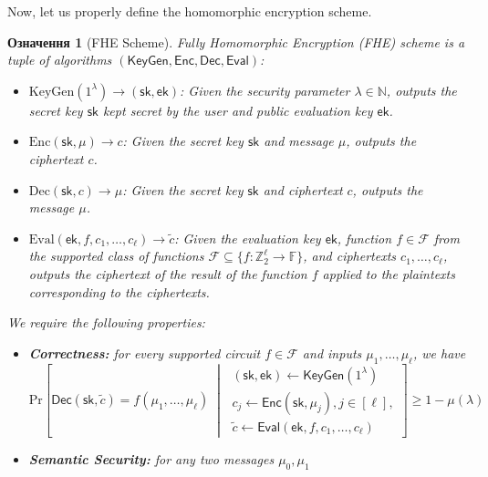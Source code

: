 \documentclass[12pt,a4paper,oneside]{book}
\theoremstyle{dplplain}
\theoremstyle{dpldefinition}
\newtheorem{definition}[theorem]{Означення}%
\theoremstyle{dplremark}
\begin{document}
Now, let us properly define the homomorphic encryption scheme.
\begin{definition}[FHE Scheme]
    Fully Homomorphic Encryption (FHE) scheme is a tuple of algorithms
    $(\mathsf{KeyGen}, \mathsf{Enc}, \mathsf{Dec}, \mathsf{Eval})$:
    \begin{itemize}
        \item $\mathrm{KeyGen}(1^{\lambda}) \to (\mathsf{sk},\mathsf{ek})$: Given the 
        security parameter $\lambda \in \mathbb{N}$, outputs the secret key $\mathsf{sk}$
        kept secret by the user and public evaluation key $\mathsf{ek}$.
        \item $\mathrm{Enc}(\mathsf{sk},\mu) \to c$: Given the secret key $\mathsf{sk}$
        and message $\mu$, outputs the ciphertext $c$.
        \item $\mathrm{Dec}(\mathsf{sk},c) \to \mu$: Given the secret key
        $\mathsf{sk}$ and ciphertext $c$, outputs the message $\mu$.
        \item $\mathrm{Eval}(\mathsf{ek},f,c_1,\ldots,c_{\ell}) \to
        \widetilde{c}$: Given the evaluation key $\mathsf{ek}$, function $f \in
        \mathcal{F}$ from the supported class of functions $\mathcal{F}
        \subseteq \{f: \mathbb{Z}^{\ell}_2 \to \mathbb{F}\}$, and ciphertexts
        $c_1,\ldots,c_{\ell}$, outputs the ciphertext of the result of the
        function $f$ applied to the plaintexts corresponding to the ciphertexts.
    \end{itemize}
    We require the following properties:
    \begin{itemize}
        \item \textbf{Correctness:} for every supported circuit $f \in \mathcal{F}$ and 
        inputs $\mu_1,\dots,\mu_{\ell}$, we have
        \begin{equation*}
            \text{Pr}\left[ \mathsf{Dec}(\mathsf{sk},\widetilde{c}) = f(\mu_1,\dots,\mu_{\ell}) \; \middle| \; \begin{matrix}
                (\mathsf{sk},\mathsf{ek}) \gets \mathsf{KeyGen}(1^{\lambda}) \\
                c_j \gets \mathsf{Enc}(\mathsf{sk},\mu_j), j \in [\ell], \\
                \widetilde{c} \gets \mathsf{Eval}(\mathsf{ek},f,c_1,\dots,c_{\ell})
            \end{matrix} \right] \geq 1 - \mu(\lambda)
        \end{equation*}
        \item \textbf{Semantic Security:} for any two messages $\mu_0,\mu_1$

\end{itemize}
\end{definition}
\end{document}
